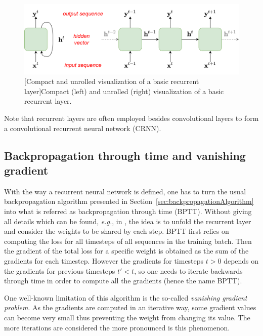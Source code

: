 \begin{figure}[t]
    \begin{center}
    \includegraphics[width=1.\linewidth]{Images/chap3/basicRecurrentLayer.png}
    [Compact and unrolled visualization of a basic recurrent layer]{Compact (left) and unrolled (right) visualization of a basic recurrent layer.}
    \label{fig:basicRecurrentLayer}
    \end{center}
\end{figure}

Note that recurrent layers are often employed besides convolutional layers to form a convolutional recurrent neural network (CRNN).

\subsection{Backpropagation through time and vanishing gradient}

With the way a recurrent neural network is defined, one has to turn the usual backpropagation algorithm presented in Section~\ref{sec:backpropagationAlgorithm} into what is referred as backpropagation through time (BPTT). Without giving all details which can be found, \emph{e.g.}, in \cite{goodfellow_deep_2016}, the idea is to unfold the recurrent layer and consider the weights to be shared by each step. BPTT first relies on computing the loss for all timesteps of all sequences in the training batch. Then the gradient of the total loss for a specific weight is obtained as the sum of the gradients for each timestep. However the gradients for timesteps $t>0$ depends on the gradients for previous timesteps $t'<t$, so one needs to iterate backwards through time in order to compute all the gradients (hence the name BPTT).

One well-known limitation of this algorithm is the so-called \textit{vanishing gradient problem}. As the gradients are computed in an iterative way, some gradient values can become very small thus preventing the weight from changing its value. The more iterations are considered the more pronounced is this phenomenon.

